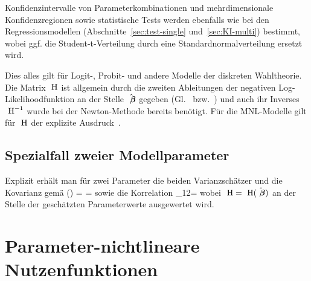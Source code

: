 Konfidenzintervalle von
Parameterkombinationen und mehrdimensionale Konfidenzregionen sowie
statistische Tests werden
ebenfalls wie bei den Regressionsmodellen
(Abschnitte~\ref{sec:test-single} und~\ref{sec:KI-multi}) bestimmt, wobei ggf. die
Student-t-Verteilung durch eine Standardnormalverteilung ersetzt wird.

Dies alles gilt f\"ur Logit-, Probit- und andere Modelle der diskreten
Wahltheorie. Die Matrix ${\mbox{ \textsf\textbf{H}}}$ ist allgemein durch 
die zweiten Ableitungen der negativen Log-Likeli\-hood\-funktion
 an der Stelle $\hat{{\mbox{ \boldmath {$\beta$}}}}$ gegeben (Gl.~ bzw.~) und auch
 ihr Inverses ${\mbox{ \textsf\textbf{H}}}^{-1}$ wurde bei der Newton-Methode bereits
ben\"otigt. F\"ur die MNL-Modelle gilt f\"ur ${\mbox{ \textsf\textbf{H}}}$ der explizite
Ausdruck~. 


\subsection{Spezialfall zweier Modellparameter}

\providecommand{\Cov}{\text{Cov} \,}

Explizit erh\"alt man f\"ur zwei Parameter die beiden
Varianzsch\"atzer und die Kovarianz gem\"a\3
\be
\label{kovarianzGaussBi}
 (\hatvecbeta)
=\myMatrixTwo{\hat{V}(\hatbeta_1) & \Cov (\hatbeta_1,\hatbeta_2)\\
\Cov (\hatbeta_1,\hatbeta_2) & \hat{V}(\hatbeta_2)}
=  
\ee
sowie die Korrelation 
\be
\label{corrBeta2}
\rho_{12}=
\ee
wobei ${\mbox{ \textsf\textbf{H}}}={\mbox{ \textsf\textbf{H}}}(\hat{{\mbox{ \boldmath {$\beta$}}}})$ an der Stelle der gesch\"atzten
Parameterwerte ausgewertet wird.


\section{\label{sec:nonlinUtility}Parameter-nichtlineare Nutzenfunktionen}
\EinsteinBeg

